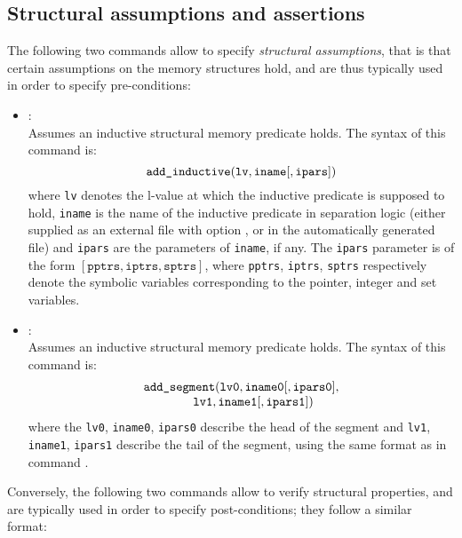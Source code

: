 \subsection{Structural assumptions and assertions}
The following two commands allow to specify {\em structural assumptions},
that is that certain assumptions on the memory structures hold, and are
thus typically used in order to specify pre-conditions:
\begin{itemize}
\item[\dcommand{add\textunderscore inductive}]: \\
  Assumes an inductive structural memory predicate holds.
  The syntax of this command is:
  \[
  \texttt{add\_inductive}( \texttt{lv}, \texttt{iname} [, \texttt{ipars}] )
  \]
  where \texttt{lv} denotes the l-value at which the inductive predicate
  is supposed to hold, \texttt{iname} is the name of the inductive
  predicate in separation logic (either supplied as an external file
  with option , or in the automatically generated
  file) and \texttt{ipars} are the parameters of \texttt{iname}, if
  any.
  The \texttt{ipars} parameter is of the form \( [ \texttt{pptrs},
  \texttt{iptrs}, \texttt{sptrs} ] \), where \texttt{pptrs},
  \texttt{iptrs}, \texttt{sptrs} respectively denote the symbolic
  variables corresponding to the pointer, integer and set variables.
\item[\dcommand{add\textunderscore segment}]: \\
  Assumes an inductive structural memory predicate holds.
  The syntax of this command is:
  \[
  \begin{array}{l}
    \texttt{add\_segment}( \texttt{lv0}, \texttt{iname0}
    [, \texttt{ipars0}], \\
    \qquad \qquad \texttt{lv1}, \texttt{iname1} [, \texttt{ipars1}] )
  \end{array}
  \]
  where the \texttt{lv0}, \texttt{iname0}, \texttt{ipars0} describe the
  head of the segment and \texttt{lv1}, \texttt{iname1}, \texttt{ipars1}
  describe the tail of the segment, using the same format as in command
  .
\end{itemize}
Conversely, the following two commands allow to verify structural
properties, and are typically used in order to specify post-conditions;
they follow a similar format:
